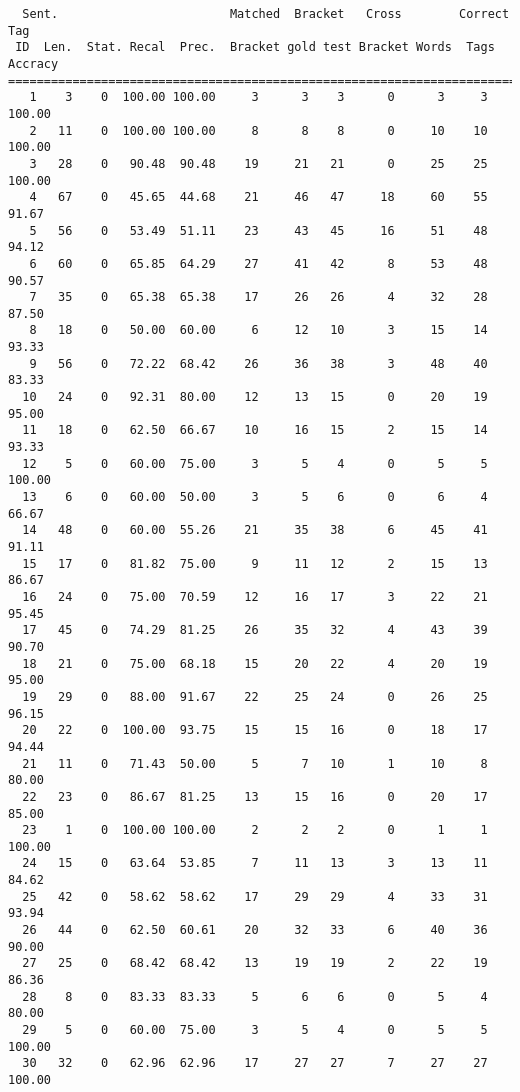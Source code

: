 \scriptsize
\begin{verbatim}
  Sent.                        Matched  Bracket   Cross        Correct Tag
 ID  Len.  Stat. Recal  Prec.  Bracket gold test Bracket Words  Tags Accracy
============================================================================
   1    3    0  100.00 100.00     3      3    3      0      3     3   100.00
   2   11    0  100.00 100.00     8      8    8      0     10    10   100.00
   3   28    0   90.48  90.48    19     21   21      0     25    25   100.00
   4   67    0   45.65  44.68    21     46   47     18     60    55    91.67
   5   56    0   53.49  51.11    23     43   45     16     51    48    94.12
   6   60    0   65.85  64.29    27     41   42      8     53    48    90.57
   7   35    0   65.38  65.38    17     26   26      4     32    28    87.50
   8   18    0   50.00  60.00     6     12   10      3     15    14    93.33
   9   56    0   72.22  68.42    26     36   38      3     48    40    83.33
  10   24    0   92.31  80.00    12     13   15      0     20    19    95.00
  11   18    0   62.50  66.67    10     16   15      2     15    14    93.33
  12    5    0   60.00  75.00     3      5    4      0      5     5   100.00
  13    6    0   60.00  50.00     3      5    6      0      6     4    66.67
  14   48    0   60.00  55.26    21     35   38      6     45    41    91.11
  15   17    0   81.82  75.00     9     11   12      2     15    13    86.67
  16   24    0   75.00  70.59    12     16   17      3     22    21    95.45
  17   45    0   74.29  81.25    26     35   32      4     43    39    90.70
  18   21    0   75.00  68.18    15     20   22      4     20    19    95.00
  19   29    0   88.00  91.67    22     25   24      0     26    25    96.15
  20   22    0  100.00  93.75    15     15   16      0     18    17    94.44
  21   11    0   71.43  50.00     5      7   10      1     10     8    80.00
  22   23    0   86.67  81.25    13     15   16      0     20    17    85.00
  23    1    0  100.00 100.00     2      2    2      0      1     1   100.00
  24   15    0   63.64  53.85     7     11   13      3     13    11    84.62
  25   42    0   58.62  58.62    17     29   29      4     33    31    93.94
  26   44    0   62.50  60.61    20     32   33      6     40    36    90.00
  27   25    0   68.42  68.42    13     19   19      2     22    19    86.36
  28    8    0   83.33  83.33     5      6    6      0      5     4    80.00
  29    5    0   60.00  75.00     3      5    4      0      5     5   100.00
  30   32    0   62.96  62.96    17     27   27      7     27    27   100.00

\end{verbatim}
